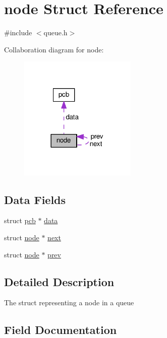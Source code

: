 \hypertarget{structnode}{}\section{node Struct Reference}
\label{structnode}


{\ttfamily \#include $<$queue.\+h$>$}



Collaboration diagram for node\+:\nopagebreak
\begin{figure}[H]
\begin{center}
\leavevmode
\includegraphics[width=158pt]{structnode__coll__graph}
\end{center}
\end{figure}
\subsection*{Data Fields}
\begin{DoxyCompactItemize}
\item 
struct \hyperlink{structpcb}{pcb} $\ast$ \hyperlink{structnode_a56d819e9a82bb2b5f48ba96fdfe01ca4}{data}
\item 
struct \hyperlink{structnode}{node} $\ast$ \hyperlink{structnode_a0dc1b6470487aa86d9936e3cab8b95be}{next}
\item 
struct \hyperlink{structnode}{node} $\ast$ \hyperlink{structnode_a530843171ca1a6e033bac999737cb184}{prev}
\end{DoxyCompactItemize}


\subsection{Detailed Description}
The struct representing a node in a queue 

\subsection{Field Documentation}

